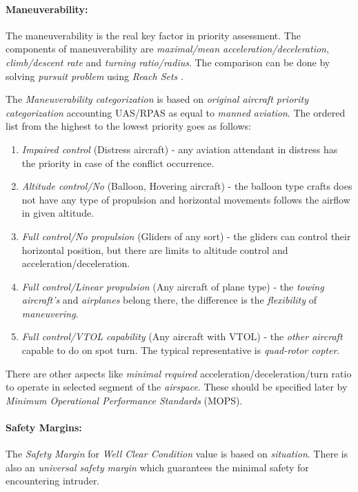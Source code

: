 \paragraph{Maneuverability:} The maneuverability is the real key factor in priority assessment.  The components of maneuverability are \emph{maximal/mean acceleration/deceleration}, \emph{climb/descent rate} and \emph{turning ratio/radius}. The comparison can be done by solving \emph{pursuit problem} using \emph{Reach Sets} \cite{game1987,game1988}.

The \emph{Maneuverability categorization} is based on \emph{original aircraft priority categorization} \cite{icaoAnnex2} accounting UAS/RPAS as equal to \emph{manned aviation}. The ordered list from the highest to the lowest priority goes as follows:

\begin{enumerate}
    \item \emph{Impaired control} (Distress aircraft) - any aviation attendant in distress has the priority in case of the conflict occurrence.
    
    \item \emph{Altitude control/No} (Balloon, Hovering aircraft) - the balloon type crafts does not have any type of propulsion and horizontal movements follows the airflow in given altitude. 
    
    
    \item \emph{Full control/No propulsion} (Gliders of any sort) - the gliders can control their horizontal position, but there are limits to altitude control and acceleration/deceleration. 
    
    \item \emph{Full control/Linear propulsion} (Any aircraft of plane type) - the \emph{towing aircraft's} and \emph{airplanes} belong there, the difference is the \emph{flexibility} of \emph{maneuvering}.
    
    \item \emph{Full control/VTOL capability} (Any aircraft with VTOL) - the \emph{other aircraft} capable to do on spot turn. The typical representative is \emph{quad-rotor copter}.
\end{enumerate}

There are other aspects like \emph{minimal required} acceleration/deceleration/turn ratio to operate in selected segment of the \emph{airspace}. These should be specified later by \emph{Minimum Operational Performance Standards} (MOPS).

\paragraph{Safety Margins:} The \emph{Safety Margin} for \emph{Well Clear Condition} value is based on \emph{situation}. There is also an \emph{universal safety margin} which guarantees the minimal safety for encountering intruder. 

